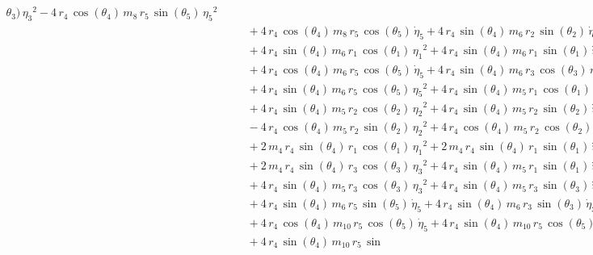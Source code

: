 \begin{eqnarray*}
{\theta_{3}})\,{{\eta_{3}}}^2 - 4\,r_{4}\,\cos({\theta_{4}})\,m_{8}\,r
_{5}\,\sin({\theta_{5}})\,{{\eta_{5}}}^2 \\ &&\quad\mbox{} + 4\,r_{4}
\,\cos({\theta_{4}})\,m_{8}\,r_{5}\,\cos({\theta_{5}})\,{\dot{\eta}_{5
}} + 4\,r_{4}\,\sin({\theta_{4}})\,m_{6}\,r_{2}\,\sin({\theta_{2}})\,{
\dot{\eta}_{2}} \\ &&\quad\mbox{} + 4\,r_{4}\,\sin({\theta_{4}})\,m_{6
}\,r_{1}\,\cos({\theta_{1}})\,{{\eta_{1}}}^2 + 4\,r_{4}\,\sin({\theta
_{4}})\,m_{6}\,r_{1}\,\sin({\theta_{1}})\,{\dot{\eta}_{1}}
 \\ &&\quad\mbox{} + 4\,r_{4}\,\cos({\theta_{4}})\,m_{6}\,r_{5}\,\cos(
{\theta_{5}})\,{\dot{\eta}_{5}} + 4\,r_{4}\,\sin({\theta_{4}})\,m_{6}
\,r_{3}\,\cos({\theta_{3}})\,{{\eta_{3}}}^2 \\ &&\quad\mbox{} + 4\,r_{
4}\,\sin({\theta_{4}})\,m_{6}\,r_{5}\,\cos({\theta_{5}})\,{{\eta_{5}}}
^2 + 4\,r_{4}\,\sin({\theta_{4}})\,m_{5}\,r_{1}\,\cos({\theta_{1}})\,{
{\eta_{1}}}^2 \\ &&\quad\mbox{} + 4\,r_{4}\,\sin({\theta_{4}})\,m_{5}
\,r_{2}\,\cos({\theta_{2}})\,{{\eta_{2}}}^2 + 4\,r_{4}\,\sin({\theta_{
4}})\,m_{5}\,r_{2}\,\sin({\theta_{2}})\,{\dot{\eta}_{2}}
 \\ &&\quad\mbox{} - 4\,r_{4}\,\cos({\theta_{4}})\,m_{5}\,r_{2}\,\sin(
{\theta_{2}})\,{{\eta_{2}}}^2 + 4\,r_{4}\,\cos({\theta_{4}})\,m_{5}\,r
_{2}\,\cos({\theta_{2}})\,{\dot{\eta}_{2}} \\ &&\quad\mbox{} + 2\,m_{4
}\,r_{4}\,\sin({\theta_{4}})\,r_{1}\,\cos({\theta_{1}})\,{{\eta_{1}}}^
2 + 2\,m_{4}\,r_{4}\,\sin({\theta_{4}})\,r_{1}\,\sin({\theta_{1}})\,{
\dot{\eta}_{1}} \\ &&\quad\mbox{} + 2\,m_{4}\,r_{4}\,\sin({\theta_{4}}
)\,r_{3}\,\cos({\theta_{3}})\,{{\eta_{3}}}^2 + 4\,r_{4}\,\sin({\theta
_{4}})\,m_{5}\,r_{1}\,\sin({\theta_{1}})\,{\dot{\eta}_{1}}
 \\ &&\quad\mbox{} + 4\,r_{4}\,\sin({\theta_{4}})\,m_{5}\,r_{3}\,\cos(
{\theta_{3}})\,{{\eta_{3}}}^2 + 4\,r_{4}\,\sin({\theta_{4}})\,m_{5}\,r
_{3}\,\sin({\theta_{3}})\,{\dot{\eta}_{3}} \\ &&\quad\mbox{} + 4\,r_{4
}\,\sin({\theta_{4}})\,m_{6}\,r_{5}\,\sin({\theta_{5}})\,{\dot{\eta}_{
5}} + 4\,r_{4}\,\sin({\theta_{4}})\,m_{6}\,r_{3}\,\sin({\theta_{3}})\,
{\dot{\eta}_{3}} \\ &&\quad\mbox{} + 4\,r_{4}\,\cos({\theta_{4}})\,m_{
10}\,r_{5}\,\cos({\theta_{5}})\,{\dot{\eta}_{5}} + 4\,r_{4}\,\sin({
\theta_{4}})\,m_{10}\,r_{5}\,\cos({\theta_{5}})\,{{\eta_{5}}}^2
 \\ &&\quad\mbox{} + 4\,r_{4}\,\sin({\theta_{4}})\,m_{10}\,r_{5}\,\sin

\end{eqnarray*}
